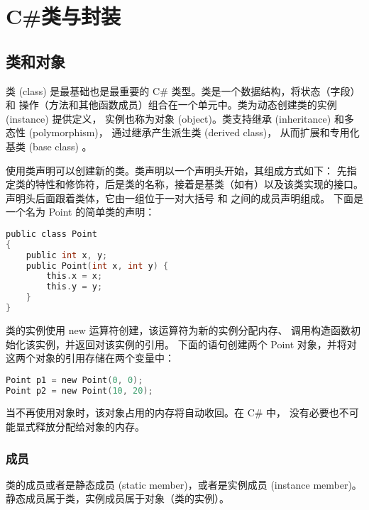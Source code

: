 ﻿%

\chapter{C\#类与封装}

\section{类和对象}
类 (class) 是最基础也是最重要的 C\# 类型。类是一个数据结构，将状态（字段）和
操作（方法和其他函数成员）组合在一个单元中。类为动态创建类的实例 (instance) 提供定义，
实例也称为对象 (object)。类支持继承 (inheritance) 和多态性 (polymorphism)，
通过继承产生派生类 (derived class)， 从而扩展和专用化基类 (base class) 。

使用类声明可以创建新的类。类声明以一个声明头开始，其组成方式如下：
先指定类的特性和修饰符，后是类的名称，接着是基类（如有）以及该类实现的接口。
声明头后面跟着类体，它由一组位于一对大括号 { 和 } 之间的成员声明组成。
下面是一个名为 Point 的简单类的声明：

 \begin{lstlisting}[language=C]
public class Point
{
    public int x, y;
    public Point(int x, int y) {
        this.x = x;
        this.y = y;
    }
}
\end{lstlisting}

类的实例使用 new 运算符创建，该运算符为新的实例分配内存、
调用构造函数初始化该实例，并返回对该实例的引用。
下面的语句创建两个 Point 对象，并将对这两个对象的引用存储在两个变量中：

 \begin{lstlisting}[language=C]
Point p1 = new Point(0, 0);
Point p2 = new Point(10, 20);
\end{lstlisting}

当不再使用对象时，该对象占用的内存将自动收回。在 C\# 中，
没有必要也不可能显式释放分配给对象的内存。

\subsection{成员}
类的成员或者是静态成员 (static member)，或者是实例成员 (instance member)。
静态成员属于类，实例成员属于对象（类的实例）。


